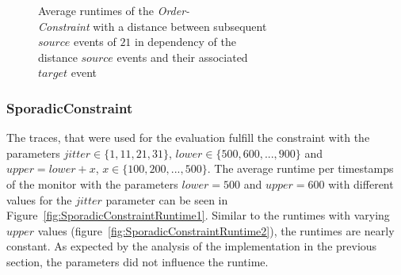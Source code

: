 \begin{figure}
\begin{minipage}{0.45\textwidth}
		\centering
		\caption{Average runtimes of the \textit{Order-\\Constraint} with a distance between subsequent\\ $source$ events of $21$ in dependency of the\\ distance $source$ events and their associated\\ $target$ event}
		\label{fig:OrderConstraintRunTime2}
	\end{minipage}
\end{figure}

\subsubsection{SporadicConstraint}
The traces, that were used for the evaluation fulfill the constraint with the parameters $jitter\in\{1,11,21,31\}$, $lower\in\{500,600,...,900\}$ and $upper=lower+x$, $x\in\{100, 200, ..., 500\}$. The average runtime per timestamps of the monitor with the parameters $lower=500$ and $upper=600$ with different values for the $jitter$ parameter can be seen in Figure~\ref{fig:SporadicConstraintRuntime1}. Similar to the runtimes with varying $upper$ values (figure~\ref{fig:SporadicConstraintRuntime2}), the runtimes are nearly constant. As expected by the analysis of the implementation in the previous section, the parameters did not influence the runtime.

